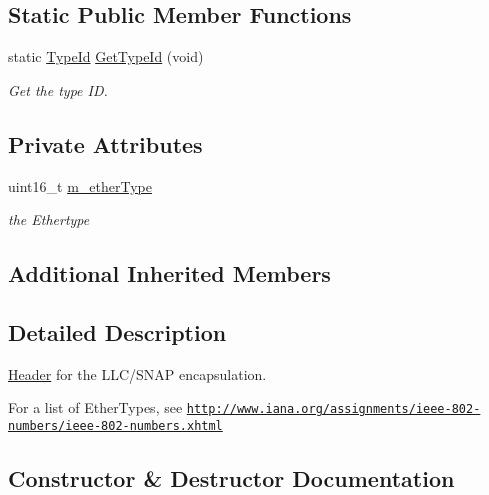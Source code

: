 \subsection*{Static Public Member Functions}
\begin{DoxyCompactItemize}
\item 
static \hyperlink{classns3_1_1TypeId}{Type\+Id} \hyperlink{classns3_1_1LlcSnapHeader_a40a060e5e97489ec68dd64c9376daf90}{Get\+Type\+Id} (void)
\begin{DoxyCompactList}\small\item\em Get the type ID. \end{DoxyCompactList}\end{DoxyCompactItemize}
\subsection*{Private Attributes}
\begin{DoxyCompactItemize}
\item 
uint16\+\_\+t \hyperlink{classns3_1_1LlcSnapHeader_a38a37e91060aa633244e957517a4835a}{m\+\_\+ether\+Type}
\begin{DoxyCompactList}\small\item\em the Ethertype \end{DoxyCompactList}\end{DoxyCompactItemize}
\subsection*{Additional Inherited Members}


\subsection{Detailed Description}
\hyperlink{classns3_1_1Header}{Header} for the L\+L\+C/\+S\+N\+AP encapsulation. 

For a list of Ether\+Types, see \href{http://www.iana.org/assignments/ieee-802-numbers/ieee-802-numbers.xhtml}{\tt http\+://www.\+iana.\+org/assignments/ieee-\/802-\/numbers/ieee-\/802-\/numbers.\+xhtml} 

\subsection{Constructor \& Destructor Documentation}
